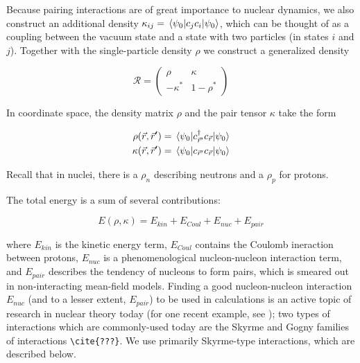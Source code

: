 Because pairing interactions are of great importance to nuclear dynamics, we also construct an additional density $\kappa_{ij} = \expval{c_jc_i}{\psi_0}$, which can be thought of as a coupling between the vacuum state and a state with two particles (in states $i$ and $j$). Together with the single-particle density $\rho$ we construct a generalized density

\begin{equation}
\mathcal{R} = \left(\begin{array}{cc}
\rho & \kappa \\
-\kappa^* & 1-\rho^*
\end{array}\right)
\end{equation}

In coordinate space, the density matrix $\rho$ and the pair tensor $\kappa$ take the form

\begin{align}
\rho(\vec{r},\vec{r}') &= \expval{c_{\vec{r}'}^\dagger c_{\vec{r}}}{\psi_0} \\
\kappa(\vec{r},\vec{r}') &= \expval{c_{\vec{r}'} c_{\vec{r}}}{\psi_0}
\end{align}

\noindent Recall that in nuclei, there is a $\rho_n$ describing neutrons and a $\rho_p$ for protons.

The total energy is a sum of several contributions:

\begin{equation}
E(\rho, \kappa) = E_{kin} + E_{Coul} + E_{nuc} + E_{pair}
\end{equation}

\noindent where $E_{kin}$ is the kinetic energy term, $E_{Coul}$ contains the Coulomb ineraction between protons, $E_{nuc}$ is a phenomenological nucleon-nucleon interaction term, and $E_{pair}$ describes the tendency of nucleons to form pairs, which is smeared out in non-interacting mean-field models. Finding a good nucleon-nucleon interaction $E_{nuc}$ (and to a lesser extent, $E_{pair}$) to be used in calculations is an active topic of research in nuclear theory today (for one recent example, see \cite{NavarroPerez2018}); two types of interactions which are commonly-used today are the Skyrme and Gogny families of interactions \verb|\cite{???}|. We use primarily Skyrme-type interactions, which are described below.

